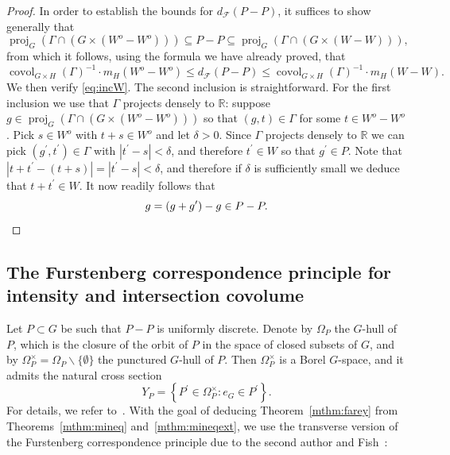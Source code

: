 \documentclass{amsart}
\numberwithin{equation}{subsection}
\theoremstyle{remark}
\begin{document}
\begin{proof}
In order to establish the bounds for \(d_{\mathcal{F}}\left(P-P\right)\), it suffices to show generally that
\begin{equation}\label{eq:incW}
\operatorname{proj}_{G}\left(\Gamma\cap\left(G\times\left(W^{o}-W^{o}\right)\right)\right)\subseteq P-P\subseteq\operatorname{proj}_{G}\left(\Gamma\cap\left(G\times\left(W-W\right)\right)\right),
\end{equation}
from which it follows, using the formula we have already proved, that
\[\operatorname{covol}_{G\times H}\left(\Gamma\right)^{-1}\cdot m_{H}\left(W^{o}-W^{o}\right)\leq d_{\mathcal{F}}\left(P-P\right)\leq\operatorname{covol}_{G\times H}\left(\Gamma\right)^{-1}\cdot m_{H}\left(W-W\right).\]
We then verify \eqref{eq:incW}. The second inclusion is straightforward. For the first inclusion we use that \(\Gamma\) projects densely to \(\mathbb{R}\): suppose \(g\in\operatorname{proj}_{G}\left(\Gamma\cap\left(G\times\left(W^{o}-W^{o}\right)\right)\right)\) so that \(\left(g,t\right)\in\Gamma\) for some \(t\in W^{o}-W^{o}\). Pick \(s\in W^{o}\) with \(t+s\in W^{o}\) and let \(\delta>0\). Since \(\Gamma\) projects densely to \(\mathbb{R}\) we can pick \(\left(g^{\prime},t^{\prime}\right)\in\Gamma\) with \(\left|t^{\prime}-s\right|<\delta\), and therefore \(t^{\prime}\in W\) so that \(g^{\prime}\in P\). Note that \(\left|t+t^{\prime}-\left(t+s\right)\right|=\left|t^{\prime}-s\right|<\delta\), and therefore if \(\delta\) is sufficiently small we deduce that \(t+t^{\prime}\in W\). It now readily follows that
\[g=\left(g+g^{\prime}\right)-g\in P-P.\qedhere\]
\end{proof}

\subsection{The Furstenberg correspondence principle for intensity and intersection covolume}

Let \(P\subset G\) be such that \(P-P\) is uniformly discrete. Denote by \(\Omega_{P}\) the \(G\)-hull of \(P\), which is the closure of the orbit of \(P\) in the space of closed subsets of \(G\), and by \(\Omega_{P}^{\times}=\Omega_{P}\backslash\{\emptyset\}\) the punctured \(G\)-hull of \(P\). Then \(\Omega_{P}^{\times}\) is a Borel \(G\)-space, and it admits the natural cross section
\[Y_{P}=\left\{P^{\prime}\in\Omega_{P}^{\times}:e_{G}\in P^{\prime}\right\}.\]
For details, we refer to~\cite[\S2.2]{BjFi2024}. With the goal of deducing Theorem~\ref{mthm:farey} from Theorems~\ref{mthm:mineq} and~\ref{mthm:mineqext}, we use the transverse version of the Furstenberg correspondence principle due to the second author and Fish~\cite{BjFi2024}:
\end{document}
